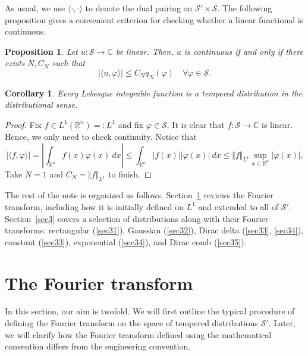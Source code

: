 \documentclass[12pt, letterpaper]{article}
\theoremstyle{plain}
\newtheorem{corollary}[theorem]{Corollary}
\newtheorem{proposition}[theorem]{Proposition}
\renewcommand{\phi}{\varphi}
\begin{document}
As usual, we use $\langle \cdot, \cdot \rangle$ to denote the dual pairing on $\mathcal{S}' \times \mathcal{S}$. The following proposition gives a convenient criterion for checking whether a linear functional is continuous.

\begin{proposition}\label{criterion}
    Let $u: \mathcal{S} \to \mathbb{C}$ be linear. Then, $u$ is continuous if and only if there exists $N, C_N$ such that
    \begin{equation}
        \vert\langle u, \phi \rangle\vert \le C_N q_N(\phi) \quad \forall \phi \in \mathcal{S}.
    \end{equation}
\end{proposition}

\begin{corollary}\label{L1}
    Every Lebesgue integrable function is a tempered distribution in the distributional sense.
\end{corollary}

\begin{proof}
    Fix $f \in L^1(\mathbb{R}^n) =: L^1$ and fix $\phi \in \mathcal{S}$. It is clear that $f: \mathcal{S} \to \mathbb{C}$ is linear. Hence, we only need to check continuity. Notice that
    \begin{equation}
        \vert \langle f, \phi \rangle \vert = \left \vert \int_{\mathbb{R}^n} f(x) \phi(x) \ dx \right \vert \le \int_{\mathbb{R}^n} \vert f(x) \vert \vert \phi(x) \vert \ dx \le \Vert f \Vert_{L^1} \sup_{x \in \mathbb{R}^n} \vert \phi(x) \vert. 
    \end{equation}
    Take $N = 1$ and $C_N = \Vert f \Vert_{L^1}$ to finish.
\end{proof}

The rest of the note is organized as follows. Section~\ref{sec2} reviews the Fourier transform, including how it is initially defined on $L^1$ and extended to all of $\mathcal{S}'$. Section~\ref{sec3} covers a selection of distributions along with their Fourier transforms: rectangular (\ref{sec31}), Gaussian (\ref{sec32}), Dirac delta (\ref{sec33}, \ref{sec34}), constant (\ref{sec33}), exponential (\ref{sec34}), and Dirac comb (\ref{sec35}).

\section{The Fourier transform}\label{sec2}

In this section, our aim is twofold. We will first outline the typical procedure of defining the Fourier transform on the space of tempered distributions $\mathcal{S}'$. Later, we will clarify how the Fourier transform defined using the mathematical convention differs from the engineering convention.
\end{document}
